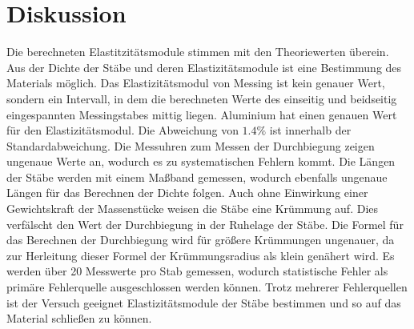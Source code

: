 \section{Diskussion}
\label{sec:Diskussion}
Die berechneten Elastitzitätsmodule stimmen mit den Theoriewerten überein. Aus der Dichte der Stäbe und deren
Elastizitätsmodule ist eine Bestimmung des Materials möglich. Das Elastizitätsmodul von Messing ist kein
genauer Wert, sondern ein Intervall, in dem die berechneten Werte des einseitig und beidseitig eingespannten Messingstabes
mittig liegen. Aluminium hat einen genauen Wert für den Elastizitätsmodul. Die Abweichung von $1.4\%$ ist innerhalb der Standardabweichung.
Die Messuhren zum Messen der Durchbiegung
zeigen ungenaue Werte an, wodurch es zu systematischen Fehlern kommt. Die Längen der Stäbe werden mit
einem Maßband gemessen, wodurch ebenfalls ungenaue Längen für das Berechnen der Dichte folgen. Auch
ohne Einwirkung einer Gewichtskraft der Massenstücke weisen die Stäbe eine Krümmung auf. Dies
verfälscht den Wert der Durchbiegung in der Ruhelage der Stäbe. Die Formel für das Berechnen der
Durchbiegung wird für größere Krümmungen ungenauer, da zur Herleitung dieser Formel der
Krümmungsradius als klein genähert wird. Es werden über 20 Messwerte pro Stab gemessen, wodurch
statistische Fehler als primäre Fehlerquelle ausgeschlossen werden können.
Trotz mehrerer Fehlerquellen ist der Versuch geeignet Elastizitätsmodule der Stäbe
bestimmen und so auf das Material schließen zu können.
